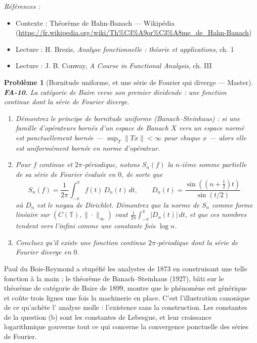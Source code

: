 \documentclass[11pt]{article}
\newtheorem{problem}{Problème}
\newenvironment{refs}{\par\small\noindent\emph{Références :}\begin{itemize}\setlength\itemsep{0pt}}{\end{itemize}\normalsize}
\begin{document}
\begin{refs}
\item Contexte : Théorème de Hahn-Banach --- Wikipédia (\url{https://fr.wikipedia.org/wiki/Th%C3%A9or%C3%A8me_de_Hahn-Banach})
\item Lecture : H. Brezis, \textit{Analyse fonctionnelle : théorie et applications}, ch. 1
\item Lecture : J. B. Conway, \textit{A Course in Functional Analysis}, ch. III
\end{refs}

\bigskip

\begin{problem}[{Bornitude uniforme, et une série de Fourier qui diverge --- Master}]
\textbf{FA-10.} La catégorie de Baire verse son premier dividende : une fonction continue dont la
série de Fourier diverge.
\begin{enumerate}
\item[(a)] Démontrez le principe de bornitude uniforme (Banach--Steinhaus) : si une famille d'opérateurs
bornés d'un espace de Banach $ X $ vers un espace normé est ponctuellement bornée ---
$ \sup_T \|Tx\| < \infty $ pour chaque $ x $ --- alors elle est uniformément bornée en norme
d'opérateur.
\item[(b)] Pour $ f $ continue et $ 2\pi $-périodique, notons $ S_n(f) $ la $ n $-ième somme
partielle de sa série de Fourier évaluée en $ 0 $, de sorte que
\[ S_n(f) = \frac{1}{2\pi} \int_{-\pi}^{\pi} f(t)\,D_n(t)\,dt , \qquad
D_n(t) = \frac{\sin((n+\frac{1}{2})t)}{\sin(t/2)} \]
où $ D_n $ est le noyau de Dirichlet. Démontrez que la norme de $ S_n $ comme forme linéaire sur
$ (C(\mathbb{T}), \|\cdot\|_\infty) $ vaut
$ \frac{1}{2\pi}\int_{-\pi}^{\pi} |D_n(t)|\,dt $, et que ces nombres tendent vers l'infini comme
une constante fois $ \log n $.
\item[(c)] Concluez qu'il existe une fonction continue $ 2\pi $-périodique dont la série de Fourier diverge
en $ 0 $.
\end{enumerate}

\end{problem}

\noindent Paul du Bois-Reymond a stupéfié les analystes de 1873 en construisant une telle
fonction à la main ; le théorème de Banach--Steinhaus (1927), bâti sur le théorème de catégorie de Baire
de 1899, montre que le phénomène est générique et coûte trois lignes une fois la machinerie en place.
C'est l'illustration canonique de ce qu'achète l'\og{} analyse molle \fg{} : l'existence sans la construction.
Les constantes de la question (b) sont les constantes de Lebesgue, et leur croissance logarithmique
gouverne tout ce qui concerne la convergence ponctuelle des séries de Fourier.
\end{document}
